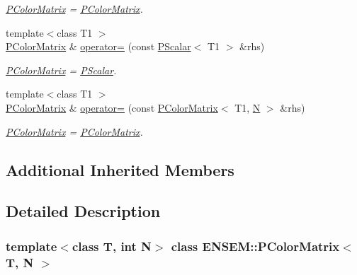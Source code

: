 \begin{DoxyCompactItemize}
\begin{DoxyCompactList}\small\item\em \mbox{\hyperlink{classENSEM_1_1PColorMatrix}{P\+Color\+Matrix}} = \mbox{\hyperlink{classENSEM_1_1PColorMatrix}{P\+Color\+Matrix}}. \end{DoxyCompactList}\item 
{\footnotesize template$<$class T1 $>$ }\\\mbox{\hyperlink{classENSEM_1_1PColorMatrix}{P\+Color\+Matrix}} \& \mbox{\hyperlink{classENSEM_1_1PColorMatrix_a7750e72b224e47b6a559f3dc112b72d3}{operator=}} (const \mbox{\hyperlink{classENSEM_1_1PScalar}{P\+Scalar}}$<$ T1 $>$ \&rhs)
\begin{DoxyCompactList}\small\item\em \mbox{\hyperlink{classENSEM_1_1PColorMatrix}{P\+Color\+Matrix}} = \mbox{\hyperlink{classENSEM_1_1PScalar}{P\+Scalar}}. \end{DoxyCompactList}\item 
{\footnotesize template$<$class T1 $>$ }\\\mbox{\hyperlink{classENSEM_1_1PColorMatrix}{P\+Color\+Matrix}} \& \mbox{\hyperlink{classENSEM_1_1PColorMatrix_a529b6a2c63f2087a6a336af14b6f80eb}{operator=}} (const \mbox{\hyperlink{classENSEM_1_1PColorMatrix}{P\+Color\+Matrix}}$<$ T1, \mbox{\hyperlink{adat__devel_2lib_2hadron_2operator__name__util_8cc_a7722c8ecbb62d99aee7ce68b1752f337}{N}} $>$ \&rhs)
\begin{DoxyCompactList}\small\item\em \mbox{\hyperlink{classENSEM_1_1PColorMatrix}{P\+Color\+Matrix}} = \mbox{\hyperlink{classENSEM_1_1PColorMatrix}{P\+Color\+Matrix}}. \end{DoxyCompactList}\end{DoxyCompactItemize}
\subsection*{Additional Inherited Members}


\subsection{Detailed Description}
\subsubsection*{template$<$class T, int N$>$\newline
class E\+N\+S\+E\+M\+::\+P\+Color\+Matrix$<$ T, N $>$}

